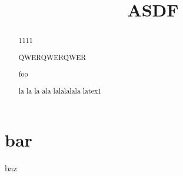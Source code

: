 \documentclass[a4paper,10pt]{article}
\title{ASDF}
\author{}
\begin{document}
\maketitle

\begin{abstract}

  1111
  
  QWERQWERQWER

  foo

la la la ala lalalalala latex1
\end{abstract}

\section{bar}
baz
\end{document}
